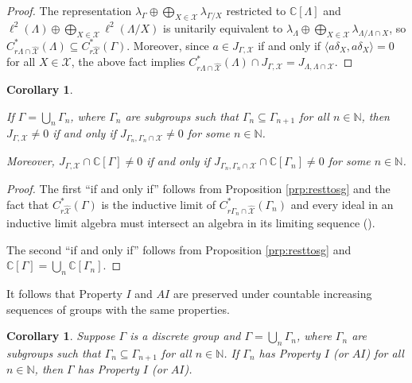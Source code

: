 \documentclass[a4paper, 12pt]{amsart}
\newtheorem{cor}[thm]{Corollary}
\theoremstyle{definition}
\theoremstyle{remark}
\numberwithin{equation}{section}
\begin{document}
\begin{proof}
    The representation $\lambda_{\Gamma}\oplus\bigoplus_{X\in\mathcal{X}}\lambda_{\Gamma/X}$ restricted to $\mathbb{C}[\Lambda]$ and $\ell^{2}(\Lambda)\oplus\bigoplus_{X\in\mathcal{X}}\ell^{2}(\Lambda/X)$ is unitarily equivalent to $\lambda_{\Lambda}\oplus\bigoplus_{X\in\mathcal{X}}\lambda_{\Lambda/\Lambda\cap X}$, so $C^{*}_{r\Lambda\cap\hat{\mathcal{X}}}(\Lambda)\subseteq C^{*}_{r\hat{\mathcal{X}}}(\Gamma)$. Moreover, since $a\in J_{\Gamma,\mathcal{X}}$ if and only if $\langle a\delta_{X}, a\delta_{X}\rangle = 0 $ for all $X\in\mathcal{X}$, the above fact implies $C^{*}_{r\Lambda\cap \hat{\mathcal{X}}}(\Lambda)\cap J_{\Gamma,\mathcal{X}} = J_{\Lambda,\Lambda\cap \mathcal{X}}$.
\end{proof}

\begin{cor}
\label{cor:ctbleunion}

    If $\Gamma = \bigcup_{n}\Gamma_{n}$, where $\Gamma_{n}$ are subgroups such that $\Gamma_{n}\subseteq \Gamma_{n+1}$ for all $n\in\mathbb{N}$, then $J_{\Gamma, \mathcal{X}}\neq 0$ if and only if $J_{\Gamma_{n}, \Gamma_{n}\cap\mathcal{X}}\neq 0$ for some $n\in\mathbb{N}$.

    Moreover, $J_{\Gamma, \mathcal{X}}\cap \mathbb{C}[\Gamma]\neq 0$ if and only if $J_{\Gamma_{n}, \Gamma_{n}\cap \mathcal{X}}\cap\mathbb{C}[\Gamma_{n}]\neq 0$ for some $n\in\mathbb{N}$.
\end{cor}

\begin{proof}
    The first ``if and only if'' follows from Proposition \ref{prp:resttosg} and the fact that $C_{r\hat{\mathcal{X}}}^{*}(\Gamma)$ is the inductive limit of $C^{*}_{r\Gamma_{n}\cap\hat{\mathcal{X}} }(\Gamma_{n})$ and every ideal in an inductive limit algebra must intersect an algebra in its limiting sequence (\cite[Lemma~III.4.1]{Davidson}).

    The second ``if and only if'' follows from Proposition \ref{prp:resttosg} and $\mathbb{C}[\Gamma] = \bigcup_{n}\mathbb{C}[\Gamma_{n}]$.
\end{proof}

It follows that Property $I$ and $AI$ are preserved under countable increasing sequences of groups with the same properties.

\begin{cor}
\label{cor:pAI&ctbleunions}
    Suppose $\Gamma$ is a discrete group and $\Gamma = \bigcup_{n}\Gamma_{n}$, where $\Gamma_{n}$ are subgroups such that $\Gamma_{n}\subseteq \Gamma_{n+1}$ for all $n\in\mathbb{N}$. If $\Gamma_{n}$ has Property $I$ (or $AI$) for all $n\in\mathbb{N}$, then $\Gamma$ has Property $I$ (or $AI$).
\end{cor}
\end{document}
